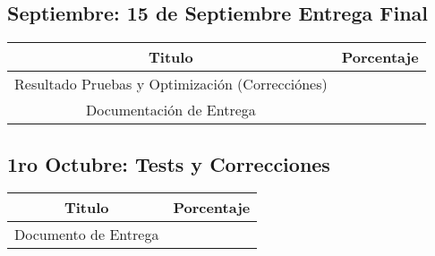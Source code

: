 \subsection{Septiembre: 15 de Septiembre Entrega Final}

\begin{center}
\begin{tabular}{|c|c|}
\hline 
Titulo & Porcentaje \\ \hline
\hline
Resultado Pruebas y Optimización (Correcciónes) & \\ \hline
Documentación de Entrega & \\ \hline
\end{tabular}
\end{center}

\subsection{1ro Octubre: Tests y Correcciones}

\begin{center}
\begin{tabular}{|c|c|}
\hline 
Titulo & Porcentaje \\ \hline
\hline
Documento de Entrega & \\ \hline
\end{tabular}
\end{center}